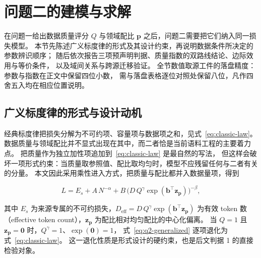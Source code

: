 \section{问题二的建模与求解}
\label{sec:problem2}

在问题一给出数据质量评分 $Q$ 与领域配比 $\boldsymbol{p}$ 之后，问题二需要把它们纳入同一损失模型。
本节先陈述广义标度律的形式及其设计约束，再说明数据条件所决定的参数辨识顺序；
随后依次报告三项预声明判据、质量指数的双路线结论、边际效用与等价条件，
以及域间关系与跨源迁移验证。
全节数值取源工件的落盘精度：参数与指数在正文中保留四位小数，
需与落盘表格逐位对照处保留八位，凡作四舍五入均在相应位置说明。

\subsection{广义标度律的形式与设计动机}
\label{subsec:q2-form}

经典标度律把损失分解为不可约项、容量项与数据项之和，见式~\eqref{eq:classic-law}。
数据质量与领域配比并不显式出现在其中，而二者恰是当前语料工程的主要着力点。
把质量作为独立加性项追加到~\eqref{eq:classic-law} 是最自然的写法，
但这样会破坏一项形式约束：当质量取参照值、配比取均匀时，模型不应残留任何与二者有关的分量。
本文因此采用乘性进入方式，把质量与配比都并入数据量项，得到

\begin{equation}
  L = E_s + A\,N^{-\alpha}
      + B\,\bigl(D\,Q^{\gamma}\exp(\boldsymbol{b}^{\top}\boldsymbol{z}_{\boldsymbol{p}})\bigr)^{-\beta},
  \label{eq:q2-generalized}
\end{equation}

其中 $E_s$ 为来源专属的不可约损失，$D_{\text{eff}}=D\,Q^{\gamma}\exp(\boldsymbol{b}^{\top}\boldsymbol{z}_{\boldsymbol{p}})$
为有效 token 数（effective token count），$\boldsymbol{z}_{\boldsymbol{p}}$ 为配比相对均匀配比的中心化偏离。
当 $Q=1$ 且 $\boldsymbol{z}_{\boldsymbol{p}}=\boldsymbol{0}$ 时，$Q^{\gamma}=1$、$\exp(\boldsymbol{0})=1$，
式~\eqref{eq:q2-generalized} 逐项退化为式~\eqref{eq:classic-law}。
这一退化性质是形式设计的硬约束，也是后文判据 1 的直接检验对象。

